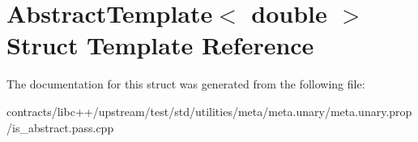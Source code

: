 \hypertarget{struct_abstract_template_3_01double_01_4}{}\section{Abstract\+Template$<$ double $>$ Struct Template Reference}
\label{struct_abstract_template_3_01double_01_4}


The documentation for this struct was generated from the following file\+:\begin{DoxyCompactItemize}
\item 
contracts/libc++/upstream/test/std/utilities/meta/meta.\+unary/meta.\+unary.\+prop/is\+\_\+abstract.\+pass.\+cpp\end{DoxyCompactItemize}
